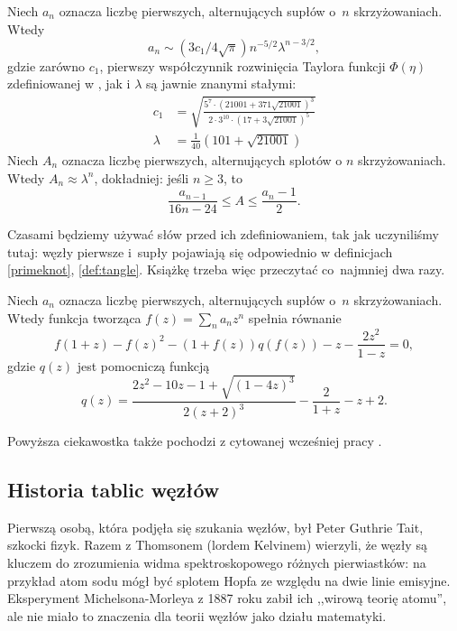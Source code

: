 \begin{proposition}
    Niech $a_n$ oznacza liczbę pierwszych, alternujących supłów o~$n$ skrzyżowaniach.
    Wtedy
    \begin{equation}
        a_n \sim (3c_1/4\sqrt{\pi})n^{-5/2}\lambda^{n-3/2},
    \end{equation}
    gdzie zarówno $c_1$, pierwszy współczynnik rozwinięcia Taylora funkcji $\Phi(\eta)$ zdefiniowanej w \cite{sundberg98}, jak i $\lambda$ są jawnie znanymi stałymi:
    \begin{align}
        c_1 & = \sqrt{\frac{5^7 \cdot (21001 + 371 \sqrt{21001})^3}{2 \cdot 3^{10} \cdot (17 + 3\sqrt{21001})^5}} \\
        \lambda & = \frac {1}{40} (101 + \sqrt{21001})
    \end{align}
    Niech $A_n$ oznacza liczbę pierwszych, alternujących splotów o $n$ skrzyżowaniach.
    Wtedy $A_n \approx \lambda^n$, dokładniej: jeśli $n \ge 3$, to
    \begin{equation}
        \frac{a_{n-1}}{16n - 24} \le A \le \frac{a_n - 1}{2}.
    \end{equation}
\end{proposition}

Czasami będziemy używać słów przed ich zdefiniowaniem, tak jak uczyniliśmy tutaj: węzły pierwsze i~supły pojawiają się odpowiednio w definicjach \ref{primeknot}, \ref{def:tangle}.
Książkę trzeba więc przeczytać co~najmniej dwa razy.

\begin{proposition}
    Niech $a_n$ oznacza liczbę pierwszych, alternujących supłów o~$n$ skrzyżowaniach.
    Wtedy funkcja tworząca $f(z) = \sum_n a_n z^n$ spełnia równanie
    \begin{equation}
    f(1+z) - f(z)^2 - (1+f(z))q(f(z)) -z - \frac{2z^2}{1-z} = 0,
    \end{equation}
    gdzie $q(z)$ jest pomocniczą funkcją
    \begin{equation}
        q(z) = \frac{2z^2 - 10z - 1 + \sqrt{(1-4z)^3}} {2(z+2)^3} - \frac{2}{1+z} -z + 2.
    \end{equation}
\end{proposition}

Powyższa ciekawostka także pochodzi z cytowanej wcześniej pracy \cite{sundberg98}.

\subsection{Historia tablic węzłów}
Pierwszą osobą, która podjęła się szukania węzłów, był Peter Guthrie Tait, szkocki fizyk.
Razem z Thomsonem (lordem Kelvinem) wierzyli, że węzły są kluczem do zrozumienia widma spektroskopowego różnych pierwiastków: na przykład atom sodu mógł być splotem Hopfa ze względu na dwie linie emisyjne.
Eksperyment Michelsona-Morleya z 1887 roku zabił ich ,,wirową teorię atomu'', ale nie miało to znaczenia dla teorii węzłów jako działu matematyki.

